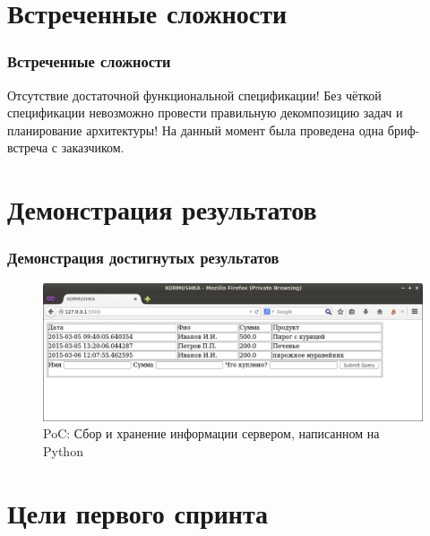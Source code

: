 \documentclass{beamer}
\begin{document}
\section{Встреченные сложности}

\begin{frame}
\frametitle{Встреченные сложности}

Отсутствие достаточной функциональной спецификации!
\bigskip
\bigskip
Без чёткой спецификации невозможно провести правильную декомпозицию задач и планирование архитектуры!
\bigskip
\bigskip
На данный момент была проведена одна бриф-встреча с заказчиком.
\end{frame}


\section{Демонстрация результатов}

\begin{frame}
\frametitle{Демонстрация достигнутых результатов}

\begin{figure}
\includegraphics[scale=0.30]{res/r1_PoC}
\caption{PoC: Сбор и хранение информации сервером, написанном на Python}
\end{figure}

\end{frame}

\section{Цели первого спринта}
\end{document}
